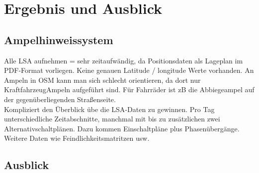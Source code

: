 \chapter{\label{chap:fazit}Ergebnis und Ausblick}
\section{Ampelhinweissystem}
Alle LSA aufnehmen = sehr zeitaufwändig, da Positionsdaten als Lageplan im \gls{PDF}-Format vorliegen. Keine genauen Latitude / longitude Werte vorhanden. An Ampeln in OSM kann man sich schlecht orientieren, da dort nur KraftfahrzeugAmpeln aufgeführt sind. Für Fahrräder ist zB die Abbiegeampel auf der gegenüberliegenden Straßenseite. \\
Kompliziert den Überblick übe die \gls{LSA}-Daten zu gewinnen. Pro Tag unterschiedliche Zeitabschnitte, manchmal mit bis zu zusätzlichen zwei Alternativschaltplänen. Dazu kommen Einschaltpläne plus Phasenübergänge. Weitere Daten wie Feindlichkeitsmatritzen usw.
\section{Ausblick}
